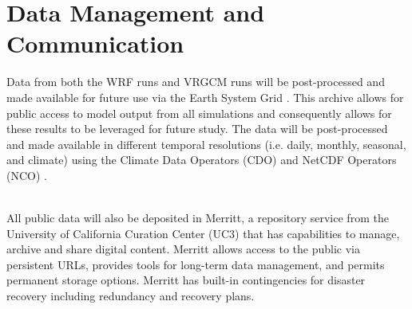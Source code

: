 \documentclass[11pt]{article}
\begin{document}
\appendix

\setcounter{section}{9}

\section{Data Management and Communication}

Data from both the WRF runs and VRGCM runs will be post-processed and made available for future use via the Earth System Grid \citep{williams2009earth}. This archive allows for public access to model output from all simulations and consequently allows for these results to be leveraged for future study.  The data will be post-processed and made available in different temporal resolutions (i.e. daily, monthly, seasonal, and climate) using the Climate Data Operators (CDO) and NetCDF Operators (NCO) \citep{schulzweida2007cdo,zender2008analysis}.

\ \\

\noindent All public data will also be deposited in Merritt, a repository service from the University of California Curation Center (UC3) that has capabilities to manage, archive and share digital content. Merritt allows access to the public via persistent URLs, provides tools for long-term data management, and permits permanent storage options. Merritt has built-in contingencies for disaster recovery including redundancy and recovery plans.

  
\end{document}
